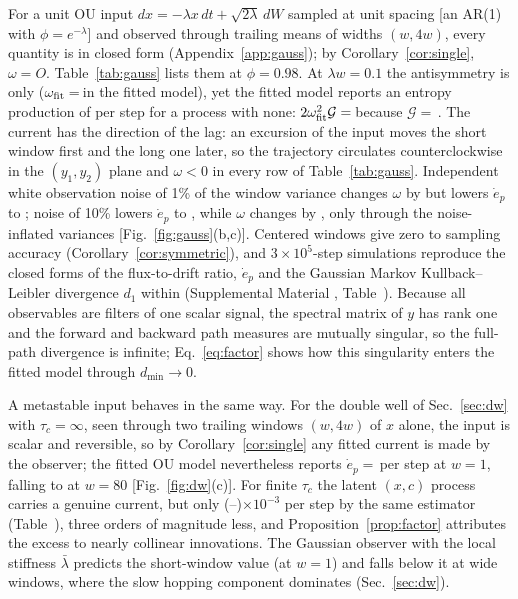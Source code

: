 For a unit OU input $dx=-\lambda x\,dt+\sqrt{2\lambda}\,dW$ sampled at unit spacing [an AR(1) with $\phi=e^{-\lambda}$] and observed through trailing means of widths $(w,4w)$, every quantity is in closed form (Appendix~\ref{app:gauss}); by Corollary~\ref{cor:single}, $\omega=O$. Table~\ref{tab:gauss} lists them at $\phi=0.98$. At $\lambda w=0.1$ the antisymmetry is only \OmTabOne ($\omega_{\rm fit}=\,$\OmFitTabOne in the fitted model), yet the fitted model reports an entropy production of \EpTabOne per step for a process with none: $2\omega_{\rm fit}^2\mathcal G=\,$\EpTabOne because $\mathcal G=\,$\GTabOne. The current has the direction of the lag: an excursion of the input moves the short window first and the long one later, so the trajectory circulates counterclockwise in the $(y_1,y_2)$ plane and $\omega<0$ in every row of Table~\ref{tab:gauss}. Independent white observation noise of 1\% of the window variance changes $\omega$ by \OmNoiseOne but lowers $\dot e_p$ to \EpNoiseOne; noise of 10\% lowers $\dot e_p$ to \EpNoiseTen, while $\omega$ changes by \OmNoiseTen, only through the noise-inflated variances [Fig.~\ref{fig:gauss}(b,c)]. Centered windows give zero to sampling accuracy (Corollary~\ref{cor:symmetric}), and $3\times10^5$-step simulations reproduce the closed forms of the flux-to-drift ratio, $\dot e_p$ and the Gaussian Markov Kullback--Leibler divergence $d_1$ within \SimMaxErr (Supplemental Material \cite{SM}, Table~). Because all observables are filters of one scalar signal, the spectral matrix of $y$ has rank one and the forward and backward path measures are mutually singular, so the full-path divergence is infinite; Eq.~\eqref{eq:factor} shows how this singularity enters the fitted model through $d_{\min}\to0$.

A metastable input behaves in the same way. For the double well of Sec.~\ref{sec:dw} with $\tau_c=\infty$, seen through two trailing windows $(w,4w)$ of $x$ alone, the input is scalar and reversible, so by Corollary~\ref{cor:single} any fitted current is made by the observer; the fitted OU model nevertheless reports $\dot e_p=\,$\DWEpOne per step at $w=1$, falling to \DWEpEighty at $w=80$ [Fig.~\ref{fig:dw}(c)]. For finite $\tau_c$ the latent $(x,c)$ process carries a genuine current, but only (\DWLatLo--\DWLatHi)$\times10^{-3}$ per step by the same estimator (Table~), three orders of magnitude less, and Proposition~\ref{prop:factor} attributes the excess to nearly collinear innovations. The Gaussian observer with the local stiffness $\bar\lambda$ predicts the short-window value (\DWPredOne at $w=1$) and falls below it at wide windows, where the slow hopping component dominates (Sec.~\ref{sec:dw}).


